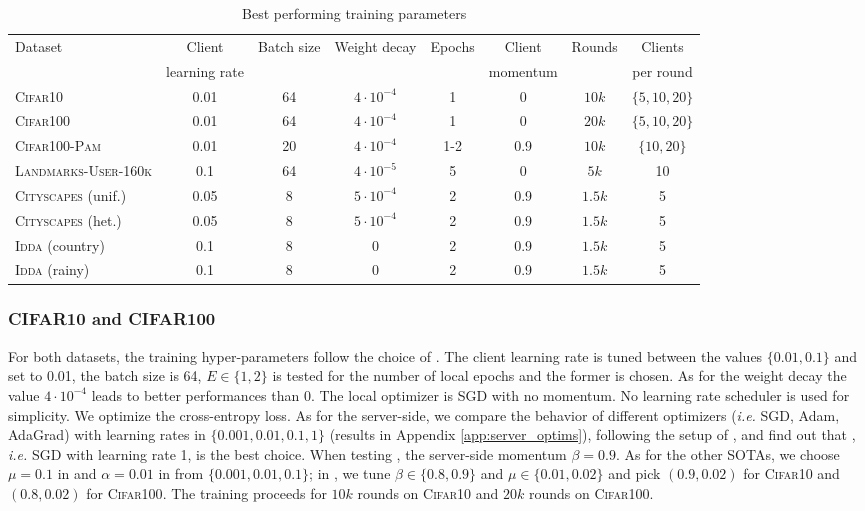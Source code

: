 \begin{table}[t]\centering
\caption{Best performing training parameters}\label{tab:best_params}
\scriptsize
    \begin{tabular}{lccccccc}
    \toprule
    \multirow{2}{*}{Dataset} & Client &\multirow{2}{*}{Batch size} & \multirow{2}{*}{Weight decay} & \multirow{2}{*}{Epochs} & Client &\multirow{2}{*}{Rounds} & Clients\\
    & learning rate& & &&momentum& & per round\\
    \midrule
    \textsc{Cifar10} &  0.01 & 64 & $4\cdot10^{-4}$ & 1 & 0 &$10k$ & $\{5,10,20\}$ \\
    \textsc{Cifar100} & 0.01 & 64 & $4\cdot10^{-4}$ & 1 & 0 &$20k$ & $\{5,10,20\}$\\
    \textsc{Cifar100-Pam} & 0.01 &20 &$4\cdot10^{-4}$ &1-2 &0.9 &$10k$ & $\{10,20\}$\\
    \textsc{Landmarks-User-160k} & 0.1 &64 &$4\cdot10^{-5}$ &5 &0 &$5k$ &10 \\
    \textsc{Cityscapes} (unif.) & 0.05& 8& $5\cdot10^{-4}$& 2& 0.9&$1.5k$ & 5\\
    \textsc{Cityscapes} (het.) &  0.05& 8& $5\cdot10^{-4}$& 2&0.9& $1.5k$ & 5\\
    \textsc{Idda} (country) & 0.1& 8& 0&2 &0.9& $1.5k$ & 5\\
    \textsc{Idda} (rainy) & 0.1& 8& 0&2 &0.9& $1.5k$ & 5\\
    \bottomrule
    \end{tabular}
\end{table}

\subsubsection{CIFAR10 and CIFAR100} For both datasets, the training hyper-parameters follow the choice of \cite{hsu2020federated}. The client learning rate is tuned between the values $\{0.01, 0.1\}$ and set to 0.01, the batch size is 64, $E\in\{1,2\}$ is tested for the number of local epochs and the former is chosen. As for the weight decay the value $4\cdot10^{-4}$ leads to better performances than 0. The local optimizer is SGD with no momentum. No learning rate scheduler is used for simplicity. We optimize the cross-entropy loss. As for the server-side, we compare the behavior of different optimizers (\textit{i.e.} SGD, Adam, AdaGrad) with learning rates in $\{0.001, 0.01, 0.1, 1\}$ (results in Appendix \ref{app:server_optims}), following the setup of \cite{reddi2020adaptive}, and find out that \fedavg, \textit{i.e.} SGD with learning rate 1, is the best choice. When testing \fedavgm, the server-side momentum $\beta=0.9$. As for the other SOTAs, we choose $\mu=0.1$ in \fedprox and $\alpha=0.01$ in \feddyn from $\{0.001,0.01,0.1\}$; in \adabest, we tune $\beta\in\{0.8,0.9\}$ and $\mu\in\{0.01,0.02\}$ and pick $(0.9,0.02)$ for \textsc{Cifar10} and $(0.8,0.02)$ for \textsc{Cifar100}. The training proceeds for $10k$ rounds on \textsc{Cifar10} and $20k$ rounds on \textsc{Cifar100}.

